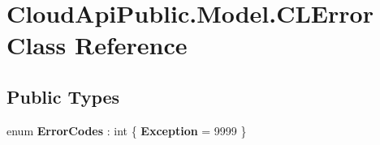 \hypertarget{class_cloud_api_public_1_1_model_1_1_c_l_error}{\section{Cloud\-Api\-Public.\-Model.\-C\-L\-Error Class Reference}
\label{class_cloud_api_public_1_1_model_1_1_c_l_error}
}
\subsection*{Public Types}
\begin{DoxyCompactItemize}
\item 
enum {\bfseries Error\-Codes} \-: int \{ {\bfseries Exception} = 9999
 \}
\end{DoxyCompactItemize}
